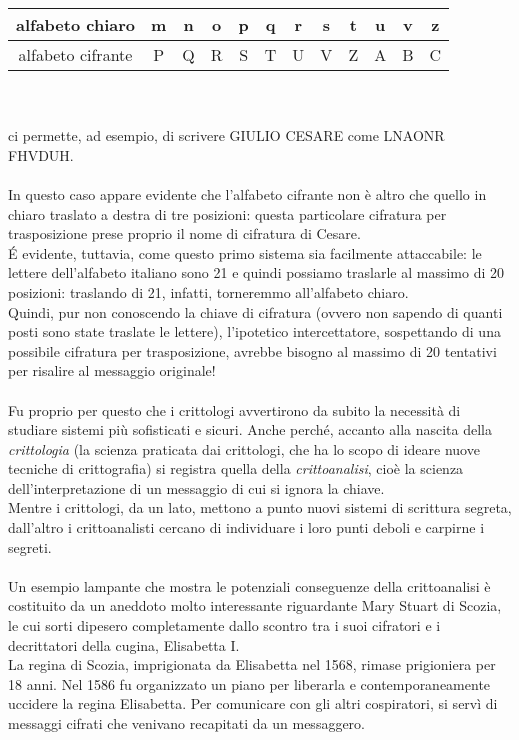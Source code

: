 \documentclass[a4paper,12pt]{article}
\begin{document}
\begin{tabular}{ | c | c | c | c | c | c | c | c | c | c | c | c | }
\hline
alfabeto chiaro & m & n & o & p & q & r & s & t & u & v & z \\
\hline
alfabeto cifrante & P & Q & R & S & T & U & V & Z & A & B & C \\
\hline
\end{tabular}\\\\
ci permette, ad esempio, di scrivere GIULIO CESARE come LNAONR FHVDUH.\\\\
In questo caso appare evidente che l’alfabeto cifrante non è altro che quello in chiaro traslato a destra di tre posizioni: questa particolare cifratura per trasposizione prese proprio il nome di cifratura di Cesare.\\
\'E evidente, tuttavia, come questo primo sistema sia facilmente attaccabile: le lettere dell’alfabeto italiano sono 21 e quindi possiamo traslarle al massimo di 20 posizioni: traslando di 21, infatti, torneremmo all’alfabeto chiaro.\\
Quindi, pur non conoscendo la chiave di cifratura (ovvero non sapendo di quanti posti sono state traslate le lettere), l'ipotetico intercettatore, sospettando di una possibile cifratura per trasposizione, avrebbe bisogno al massimo di 20 tentativi per risalire al messaggio originale!\\\\
Fu proprio per questo che i crittologi avvertirono da subito la necessità di studiare sistemi più sofisticati e sicuri. Anche perché, accanto alla nascita della \emph{crittologia} (la scienza praticata dai crittologi, che ha lo scopo di ideare nuove tecniche di crittografia) si registra quella della \emph{crittoanalisi}, cioè la scienza
dell’interpretazione di un messaggio di cui si ignora la chiave.\\
Mentre i crittologi, da un lato, mettono a punto nuovi sistemi di scrittura segreta, dall’altro i crittoanalisti cercano di individuare i loro punti deboli e carpirne i segreti.\\\\
Un esempio lampante che mostra le potenziali conseguenze della crittoanalisi è costituito da un aneddoto molto interessante riguardante Mary Stuart di Scozia, le cui sorti dipesero completamente dallo scontro tra i suoi cifratori e i decrittatori della cugina, Elisabetta I.\\
La regina di Scozia, imprigionata da Elisabetta nel 1568, rimase prigioniera per 18 anni. Nel 1586 fu organizzato un piano per liberarla e contemporaneamente uccidere la regina Elisabetta. Per comunicare con gli altri cospiratori, si servì di messaggi cifrati che venivano recapitati da un messaggero.\\
\end{document}
